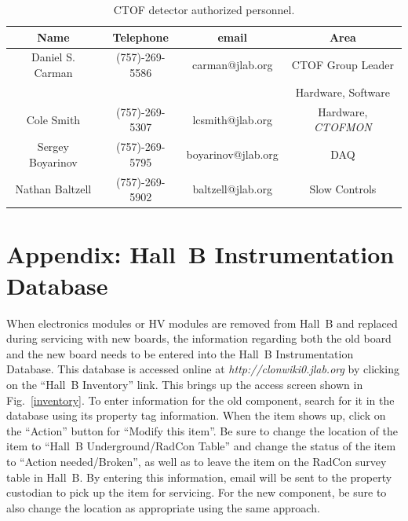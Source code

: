 \documentclass[12pt]{article}
\begin{document}
\begin{table}[htbp]
\begin{center}
\begin{tabular} {|c|c|c|c|} \hline
Name             & Telephone      & email              & Area             \\ \hline \hline
Daniel S. Carman & (757)-269-5586 & carman@jlab.org    & CTOF Group Leader\\
                 &                &                    & Hardware, Software \\ \hline
Cole Smith       & (757)-269-5307 & lcsmith@jlab.org   & Hardware, {\it CTOFMON} \\ \hline
Sergey Boyarinov & (757)-269-5795 & boyarinov@jlab.org & DAQ              \\ \hline
Nathan Baltzell  & (757)-269-5902 & baltzell@jlab.org  & Slow Controls    \\ \hline
\end{tabular}
\caption{CTOF detector authorized personnel.}
\label{expert-list}
\end{center}
\end{table}

\clearpage

\vfil
\eject

\section{Appendix: Hall~B Instrumentation Database}

When electronics modules or HV modules are removed from Hall~B and replaced during 
servicing with new boards, the information regarding both the old board and the new 
board needs to be entered into the Hall~B Instrumentation Database. This database is 
accessed online at {\it http://clonwiki0.jlab.org} by clicking on the ``Hall~B Inventory'' 
link. This brings up the access screen shown in Fig.~\ref{inventory}. To enter 
information for the old component, search for it in the database using its property 
tag information. When the item shows up, click on the ``Action'' button for ``Modify 
this item''. Be sure to change the location of the item to ``Hall~B Underground/RadCon 
Table'' and change the status of the item to ``Action needed/Broken'', as well as to 
leave the item on the RadCon survey table in Hall~B. By entering this information, 
email will be sent to the property custodian to pick up the item for servicing. For 
the new component, be sure to also change the location as appropriate using the same 
approach.
\end{document}
